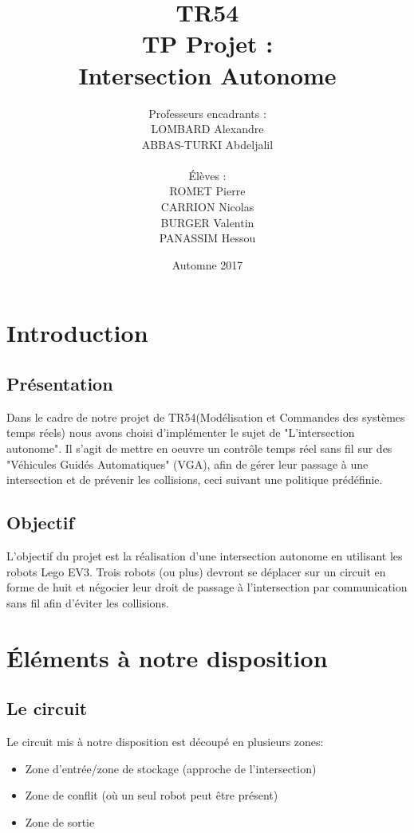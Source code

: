 \documentclass[french,a4paper,12pt]{report}
\title{TR54 \\ TP Projet :\\ Intersection Autonome}
\author{Professeurs encadrants :\\LOMBARD Alexandre \\ ABBAS-TURKI Abdeljalil\\\\ Élèves :\\ROMET Pierre\\CARRION Nicolas\\BURGER Valentin\\PANASSIM Hessou}
\date{Automne 2017}
\begin{document}
\maketitle

\tableofcontents

\part{Introduction}

\chapter{Présentation}
Dans le cadre de notre projet de TR54(Modélisation et Commandes des systèmes temps réels) nous avons choisi d'implémenter le sujet de "L'intersection autonome". Il s'agit de mettre en oeuvre un contrôle temps réel sans fil sur des "Véhicules Guidés Automatiques" (VGA), afin de gérer leur passage à une intersection et de prévenir les collisions, ceci suivant une politique prédéfinie.

\chapter{Objectif}
L'objectif du projet est la réalisation d'une intersection autonome en utilisant les robots Lego EV3.
Trois robots (ou plus) devront se déplacer sur un circuit en forme de huit et négocier leur droit de passage à
l'intersection par communication sans fil afin d'éviter les collisions.

\part{Éléments à notre disposition}

\chapter{Le circuit}
Le circuit mis à notre disposition est découpé en plusieurs zones:
\begin{itemize}
\item Zone d’entrée/zone de stockage (approche de l’intersection)
\item Zone de conflit (où un seul robot peut être présent)
\item Zone de sortie
\end{itemize}
\end{document}
